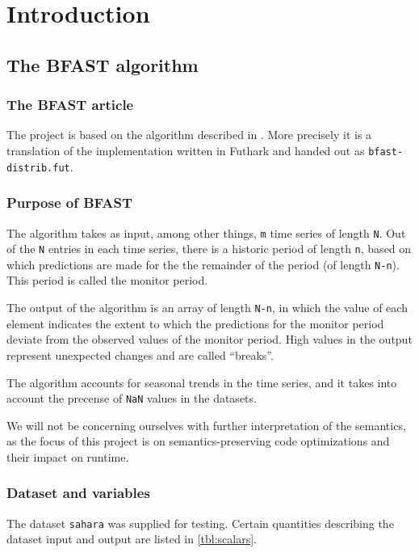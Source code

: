 \section{Introduction}

\subsection{The \textsc{BFAST} algorithm}
\subsubsection{The \textsc{BFAST} article}
The project is based on the algorithm described in \cite{bfast}.
More precisely it is a translation of the implementation written in Futhark and
handed out as \texttt{bfast-distrib.fut}.

\subsubsection{Purpose of \textsc{BFAST}}
The algorithm takes as input, among other things, \texttt{m} time series of
length \texttt{N}.
Out of the \texttt{N} entries in each time series, there is a historic period
of length \texttt{n}, based on which predictions are made for the the remainder
of the period (of length \texttt{N-n}).
This period is called the monitor period.

The output of the algorithm is an array of length \texttt{N-n}, in which the
value of each element indicates the extent to which the predictions for the
monitor period deviate from the observed values of the monitor period.
High values in the output represent unexpected changes and are called
\enquote{breaks}.

The algorithm accounts for seasonal trends in the time series, and it takes
into account the precense of \texttt{NaN} values in the datasets.

We will not be concerning ourselves with further interpretation of the
semantics, as the focus of this project is on semantics-preserving code
optimizations and their impact on runtime.


\subsubsection{Dataset and variables}

The dataset \texttt{sahara} was supplied for testing. Certain quantities
describing the dataset input and output are listed in \autoref{tbl:scalars}.



